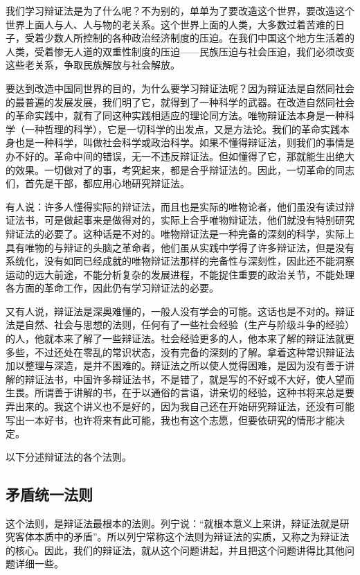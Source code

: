 我们学习辩证法是为了什么呢？不为别的，单单为了要改造这个世界，要改造这个世界上面人与人、人与物的老关系。这个世界上面的人类，大多数过着苦难的日子，受着少数人所控制的各种政治经济制度的压迫。在我们中国这个地方生活着的人类，受着惨无人道的双重性制度的压迫——民族压迫与社会压迫，我们必须改变这些老关系，争取民族解放与社会解放。

要达到改造中国同世界的目的，为什么要学习辩证法呢？因为辩证法是自然同社会的最普遍的发展发展，我们明了它，就得到了一种科学的武器。在改造自然同社会的革命实践中，就有了同这种实践相适应的理论同方法。唯物辩证法本身是一种科学（一种哲理的科学），它是一切科学的出发点，又是方法论。我们的革命实践本身也是一种科学，叫做社会科学或政治科学。如果不懂得辩证法，则我们的事情是办不好的。革命中间的错误，无一不违反辩证法。但如懂得了它，那就能生出绝大的效果。一切做对了的事，考究起来，都是合乎辩证法的。因此，一切革命的同志们，首先是干部，都应用心地研究辩证法。

有人说：许多人懂得实际的辩证法，而且也是实际的唯物论者，他们虽没有读过辩证法书，可是做起事来是做得对的，实际上合乎唯物辩证法，他们就没有特别研究辩证法的必要了。这种话是不对的。唯物辩证法是一种完备的深刻的科学，实际上具有唯物的与辩证的头脑之革命者，他们虽从实践中学得了许多辩证法，但是没有系统化，没有如同已经成就的唯物辩证法那样的完备性与深刻性，因此还不能洞察运动的远大前途，不能分析复杂的发展进程，不能捉住重要的政治关节，不能处理各方面的革命工作，因此仍有学习辩证法的必要。

又有人说，辩证法是深奥难懂的，一般人没有学会的可能。这话也是不对的。辩证法是自然、社会与思想的法则，任何有了一些社会经验（生产与阶级斗争的经验）的人，他就本来了解了一些辩证法。社会经验更多的人，他本来了解的辩证法就更多些，不过还处在零乱的常识状态，没有完备的深刻的了解。拿着这种常识辩证法加以整理与深造，是并不困难的。辩证法之所以使人觉得困难，是因为没有善于讲解的辩证法书，中国许多辩证法书，不是错了，就是写的不好或不大好，使人望而生畏。所谓善于讲解的书，在于以通俗的言语，讲亲切的经验，这种书将来总是要弄出来的。我这个讲义也不是好的，因为我自己还在开始研究辩证法，还没有可能写出一本好书，也许将来有此可能，我也有这个志愿，但要依研究的情形才能决定。

以下分述辩证法的各个法则。

\subsection{矛盾统一法则}

这个法则，是辩证法最根本的法则。列宁说：“就根本意义上来讲，辩证法就是研究客体本质中的矛盾”。所以列宁常称这个法则为辩证法的实质，又称之为辩证法的核心。因此，我们的辩证法，就从这个问题讲起，并且把这个问题讲得比其他问题详细一些。

